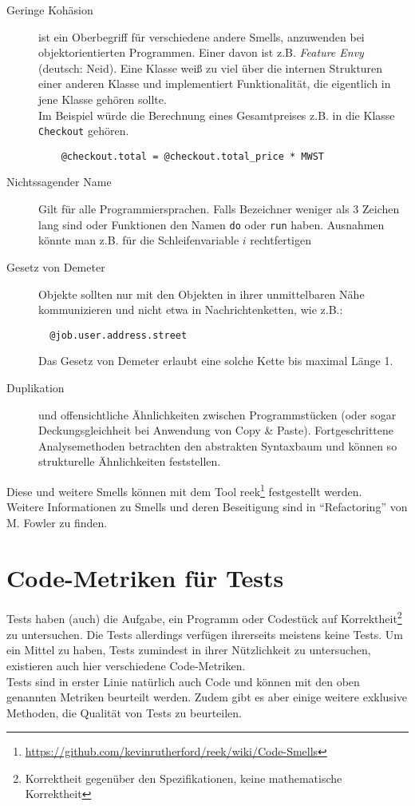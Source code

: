 \begin{description}
 \item[Geringe Kohäsion] ist ein Oberbegriff für verschiedene andere Smells, anzuwenden bei objektorientierten Programmen. Einer davon ist z.B. \textit{Feature Envy} (deutsch: Neid). Eine Klasse weiß zu viel über die internen Strukturen einer anderen Klasse und implementiert Funktionalität, die eigentlich in jene Klasse gehören sollte. \\
 Im Beispiel würde die Berechnung eines Gesamtpreises z.B. in die Klasse \texttt{Checkout} gehören.
 \begin{lstlisting}
    @checkout.total = @checkout.total_price * MWST
 \end{lstlisting}
 \item[Nichtssagender Name] Gilt für alle Programmiersprachen. Falls Bezeichner weniger als 3 Zeichen lang sind oder Funktionen den Namen \texttt{do} oder \texttt{run} haben. Ausnahmen könnte man z.B. für die Schleifenvariable $i$ rechtfertigen
 \item[Gesetz von Demeter] Objekte sollten nur mit den Objekten in ihrer unmittelbaren Nähe kommunizieren und nicht etwa in Nachrichtenketten, wie z.B.:
 \begin{lstlisting}
  @job.user.address.street
 \end{lstlisting}
 Das Gesetz von Demeter erlaubt eine solche Kette bis maximal Länge 1.
 \item[Duplikation] und offensichtliche Ähnlichkeiten zwischen Programmstücken (oder sogar Deckungsgleichheit bei Anwendung von Copy \& Paste). Fortgeschrittene Analysemethoden betrachten den abstrakten Syntaxbaum und können so strukturelle Ähnlichkeiten feststellen.
 \end{description}

Diese und weitere Smells können mit dem Tool reek\footnote{\url{https://github.com/kevinrutherford/reek/wiki/Code-Smells}} festgestellt werden.\\
Weitere Informationen zu Smells und deren Beseitigung sind in "`Refactoring"' von M. Fowler \citep{fowler_refactoring_1999} zu finden.

\section{Code-Metriken für Tests}
\label{sec:metrics}
Tests haben (auch) die Aufgabe, ein Programm oder Codestück auf Korrektheit\footnote{Korrektheit gegenüber den Spezifikationen, keine mathematische Korrektheit} zu untersuchen. Die Tests allerdings verfügen ihrerseits meistens keine Tests. Um ein Mittel zu haben, Tests zumindest in ihrer Nützlichkeit zu untersuchen, existieren auch hier verschiedene Code-Metriken.\\
Tests sind in erster Linie natürlich auch Code und können mit den oben genannten Metriken beurteilt werden. Zudem gibt es aber einige weitere exklusive Methoden, die Qualität von Tests zu beurteilen.

